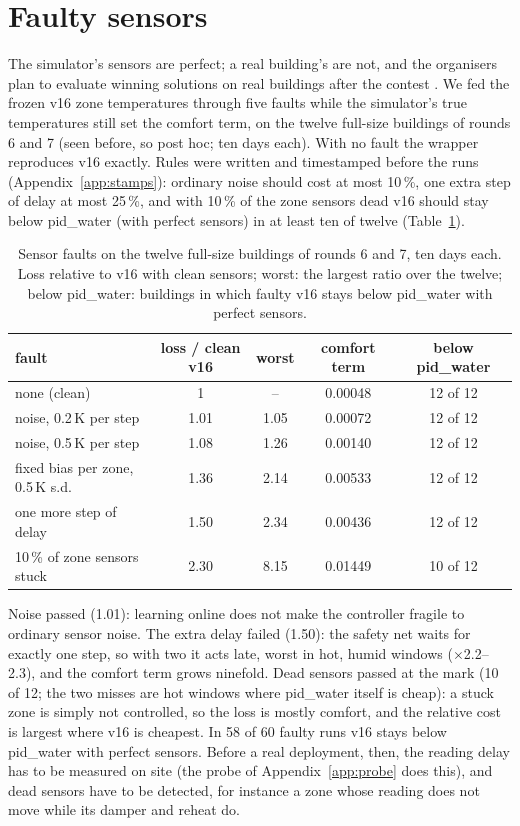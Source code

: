 \documentclass{article}
\begin{document}
\section{Faulty sensors}\label{app:faults}
The simulator's sensors are perfect; a real building's are not, and the organisers plan to evaluate winning solutions
on real buildings after the contest \cite{goldfeder2026smart}. We fed the frozen v16 zone temperatures through five
faults while the simulator's true temperatures still set the comfort term, on the twelve full-size buildings of
rounds 6 and 7 (seen before, so post hoc; ten days each). With no fault the wrapper reproduces v16 exactly. Rules were
written and timestamped before the runs (Appendix~\ref{app:stamps}): ordinary noise should cost at most 10\,\%, one extra step of delay at most 25\,\%, and with
10\,\% of the zone sensors dead v16 should stay below pid\_water (with perfect sensors) in at least ten of twelve (Table~\ref{tab:faults}).

\begin{table}[!htb]\centering
\caption{Sensor faults on the twelve full-size buildings of rounds 6 and 7, ten days each. Loss relative to v16 with clean sensors; worst: the largest ratio over the twelve; below pid\_water: buildings in which faulty v16 stays below pid\_water with perfect sensors.}\label{tab:faults}
\small
\begin{tabular}{lcccc}
\toprule
fault & loss / clean v16 & worst & comfort term & below pid\_water \\
\midrule
none (clean) & 1 & -- & 0.00048 & 12 of 12 \\
noise, 0.2\,K per step & 1.01 & 1.05 & 0.00072 & 12 of 12 \\
noise, 0.5\,K per step & 1.08 & 1.26 & 0.00140 & 12 of 12 \\
fixed bias per zone, 0.5\,K s.d. & 1.36 & 2.14 & 0.00533 & 12 of 12 \\
one more step of delay & 1.50 & 2.34 & 0.00436 & 12 of 12 \\
10\,\% of zone sensors stuck & 2.30 & 8.15 & 0.01449 & 10 of 12 \\
\bottomrule
\end{tabular}
\end{table}

Noise passed (1.01): learning online does not make the controller fragile to ordinary sensor noise. The extra delay
failed (1.50): the safety net waits for exactly one step, so with two it acts late, worst in hot, humid windows
($\times$2.2--2.3), and the comfort term grows ninefold. Dead sensors passed at the mark (10 of 12; the two misses are
hot windows where pid\_water itself is cheap): a stuck zone is simply not controlled, so the loss is mostly comfort, and
the relative cost is largest where v16 is cheapest. In 58 of 60 faulty runs v16 stays below pid\_water with perfect
sensors. Before a real deployment, then, the reading delay has to be measured on site (the probe of
Appendix~\ref{app:probe} does this), and dead sensors have to be detected, for instance a zone whose reading does not
move while its damper and reheat do.
\end{document}
